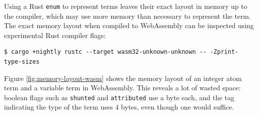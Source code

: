 Using a Rust \texttt{enum} to represent terms leaves their exact layout in memory up to the compiler, which may use more memory than necessary to represent the term. The exact memory layout when compiled to WebAssembly can be inspected using experimental Rust compiler flags:

\begin{verbatim}
$ cargo +nightly rustc --target wasm32-unknown-unknown -- -Zprint-type-sizes
\end{verbatim}

Figure \ref{fig:memory-layout-wasm} shows the memory layout of an integer atom term and a variable term in WebAssembly. This reveals a lot of wasted space: boolean flags such as \texttt{shunted} and \texttt{attributed} use a byte each, and the tag indicating the type of the term uses 4 bytes, even though one would suffice.

